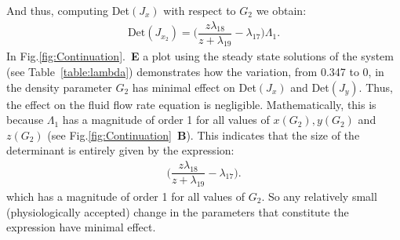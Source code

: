And thus, computing Det$(J_x)$ with respect to $G_2$ we obtain:
\begin{align*}
\text{Det}(J_{x_2})=\Big(\dfrac{z \lambda_{18}}{z+\lambda_{19}} - \lambda_{17} \Big) \Lambda_1.
\end{align*}
In Fig.\ref{fig:Continuation}.~\textbf{E} a plot using the steady state solutions of the system (see Table~\ref{table:lambda}) demonstrates how the variation, from 0.347 to 0, in the density parameter {\color{red}$G_2$} has minimal effect on Det$(J_x)$ and Det$(J_y)$. Thus, the effect on the fluid flow rate equation is negligible. Mathematically, this is because $\Lambda_1$ has a magnitude of order 1 for all values of $x(G_2), y(G_2) $ and $z(G_2)$ (see Fig.\ref{fig:Continuation}~\textbf{B}). This indicates that the size of the determinant is entirely given by the expression:
\begin{align*}
\Big(\dfrac{z \lambda_{18}}{z+\lambda_{19}} - \lambda_{17} \Big). 
\end{align*}
which has a magnitude of order 1 for all values of $G_2$. So any relatively small (physiologically accepted) change in the parameters that constitute the expression have minimal effect.\\

